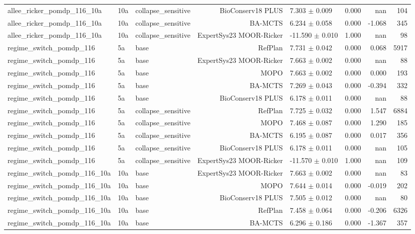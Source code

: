 \documentclass{article}
\begin{document}
\begin{longtable}{lllrlrrr}
allee\_ricker\_pomdp\_116\_10a & 10a & collapse\_sensitive & BioConserv18 PLUS & 7.303 $\pm$ 0.009 & 0.000 & nan & 104 \\
allee\_ricker\_pomdp\_116\_10a & 10a & collapse\_sensitive & BA-MCTS & 6.234 $\pm$ 0.058 & 0.000 & -1.068 & 345 \\
allee\_ricker\_pomdp\_116\_10a & 10a & collapse\_sensitive & ExpertSys23 MOOR-Ricker & -11.590 $\pm$ 0.010 & 1.000 & nan & 98 \\
regime\_switch\_pomdp\_116 & 5a & base & RefPlan & 7.731 $\pm$ 0.042 & 0.000 & 0.068 & 5917 \\
regime\_switch\_pomdp\_116 & 5a & base & ExpertSys23 MOOR-Ricker & 7.663 $\pm$ 0.002 & 0.000 & nan & 88 \\
regime\_switch\_pomdp\_116 & 5a & base & MOPO & 7.663 $\pm$ 0.002 & 0.000 & 0.000 & 193 \\
regime\_switch\_pomdp\_116 & 5a & base & BA-MCTS & 7.269 $\pm$ 0.043 & 0.000 & -0.394 & 332 \\
regime\_switch\_pomdp\_116 & 5a & base & BioConserv18 PLUS & 6.178 $\pm$ 0.011 & 0.000 & nan & 88 \\
regime\_switch\_pomdp\_116 & 5a & collapse\_sensitive & RefPlan & 7.725 $\pm$ 0.032 & 0.000 & 1.547 & 6884 \\
regime\_switch\_pomdp\_116 & 5a & collapse\_sensitive & MOPO & 7.468 $\pm$ 0.087 & 0.000 & 1.290 & 185 \\
regime\_switch\_pomdp\_116 & 5a & collapse\_sensitive & BA-MCTS & 6.195 $\pm$ 0.087 & 0.000 & 0.017 & 356 \\
regime\_switch\_pomdp\_116 & 5a & collapse\_sensitive & BioConserv18 PLUS & 6.178 $\pm$ 0.011 & 0.000 & nan & 105 \\
regime\_switch\_pomdp\_116 & 5a & collapse\_sensitive & ExpertSys23 MOOR-Ricker & -11.570 $\pm$ 0.010 & 1.000 & nan & 109 \\
regime\_switch\_pomdp\_116\_10a & 10a & base & ExpertSys23 MOOR-Ricker & 7.663 $\pm$ 0.002 & 0.000 & nan & 83 \\
regime\_switch\_pomdp\_116\_10a & 10a & base & MOPO & 7.644 $\pm$ 0.014 & 0.000 & -0.019 & 202 \\
regime\_switch\_pomdp\_116\_10a & 10a & base & BioConserv18 PLUS & 7.505 $\pm$ 0.012 & 0.000 & nan & 80 \\
regime\_switch\_pomdp\_116\_10a & 10a & base & RefPlan & 7.458 $\pm$ 0.064 & 0.000 & -0.206 & 6326 \\
regime\_switch\_pomdp\_116\_10a & 10a & base & BA-MCTS & 6.296 $\pm$ 0.186 & 0.000 & -1.367 & 357 \\

\end{longtable}
\end{document}
